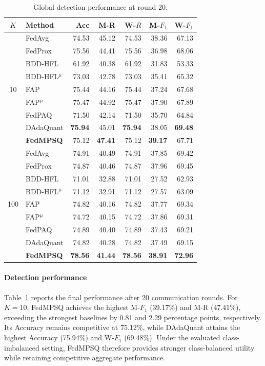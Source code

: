 \documentclass[conference,a4paper]{IEEEtran}
\newcommand{\method}{FedMPSQ}
\begin{document}
\begin{table}[ht]
\centering
\footnotesize
\caption{Global detection performance at round 20.}
\label{tab:main}

\begin{tabular}{clrrrrr}
\toprule
$K$ & Method & Acc & M-R & W-$R$ & M-$F_1$ & W-$F_1$ \\
\midrule
\multirow{9}{*}{10} & FedAvg & 74.53 & 45.12 & 74.53 & 38.36 & 67.13 \\
 & FedProx & 75.56 & 44.41 & 75.56 & 36.98 & 68.06 \\
 & BDD-HFL & 61.92 & 40.38 & 61.92 & 31.83 & 53.33 \\
 & BDD-HFL$^{\mu}$ & 73.03 & 42.78 & 73.03 & 35.41 & 65.32 \\
 & FAP & 75.44 & 44.16 & 75.44 & 37.24 & 67.68 \\
 & FAP$^{\mu}$ & 75.47 & 44.92 & 75.47 & 37.90 & 67.89 \\
 & FedPAQ & 71.50 & 42.14 & 71.50 & 35.70 & 64.84 \\
 & DAdaQuant & \textbf{75.94} & 45.01 & \textbf{75.94} & 38.05 & \textbf{69.48} \\
 & \textbf{\method{}} & 75.12 & \textbf{47.41} & 75.12 & \textbf{39.17} & 67.71 \\
\midrule
\multirow{9}{*}{100} & FedAvg & 74.91 & 40.49 & 74.91 & 37.85 & 69.42 \\
 & FedProx & 74.87 & 40.46 & 74.87 & 37.96 & 69.45 \\
 & BDD-HFL & 71.01 & 32.88 & 71.01 & 27.52 & 62.93 \\
 & BDD-HFL$^{\mu}$ & 71.12 & 32.91 & 71.12 & 27.57 & 63.09 \\
 & FAP & 74.82 & 40.16 & 74.82 & 37.77 & 69.34 \\
 & FAP$^{\mu}$ & 74.72 & 40.15 & 74.72 & 37.86 & 69.31 \\
 & FedPAQ & 74.89 & 40.40 & 74.89 & 37.43 & 69.21 \\
 & DAdaQuant & 74.82 & 40.28 & 74.82 & 37.49 & 69.15 \\
 & \textbf{\method{}} & \textbf{78.56} & \textbf{41.44} & \textbf{78.56} & \textbf{38.91} & \textbf{72.96} \\

\bottomrule
\end{tabular}
\end{table}

\paragraph{Detection performance}
Table~\ref{tab:main} reports the final performance after 20 communication
rounds. For $K=10$, FedMPSQ achieves the highest M-$F_1$ (39.17\%) and
M-R (47.41\%), exceeding the strongest baselines by 0.81 and 2.29
percentage points, respectively. Its Accuracy remains competitive at 75.12\%,
while DAdaQuant attains the highest Accuracy (75.94\%) and W-$F_1$
(69.48\%). Under the evaluated class-imbalanced setting, FedMPSQ therefore provides
stronger class-balanced utility while retaining competitive aggregate
performance.
\end{document}
